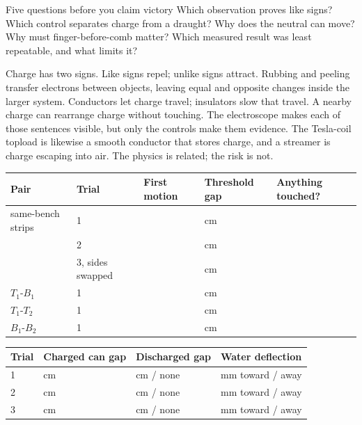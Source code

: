 \begin{telospanel}{Five questions before you claim victory}
Which observation proves like signs? Which control separates charge from a
draught? Why does the neutral can move? Why must finger-before-comb matter?
Which measured result was least repeatable, and what limits it?
\end{telospanel}


Charge has two signs. Like signs repel; unlike signs attract. Rubbing and
peeling transfer electrons between objects, leaving equal and opposite changes
inside the larger system. Conductors let charge travel; insulators slow that
travel. A nearby charge can rearrange charge without touching. The electroscope
makes each of those sentences visible, but only the controls make them evidence.
The Tesla-coil topload is likewise a smooth conductor that stores charge, and a
streamer is charge escaping into air. The physics is related; the risk is not.

\newpage
{}

\begin{center}\small
\begin{tabularx}{\linewidth}{@{}p{.20\linewidth}p{.12\linewidth}p{.18\linewidth}p{.18\linewidth}L@{}}
\toprule
Pair & Trial & First motion & Threshold gap & Anything touched?\\
\midrule
same-bench strips & 1 & & cm & \\[1.35em]
 & 2 & & cm & \\[1.35em]
 & 3, sides swapped & & cm & \\[1.35em]
\midrule
\(T_1\)-\(B_1\) & 1 & & cm & \\[1.35em]
\(T_1\)-\(T_2\) & 1 & & cm & \\[1.35em]
\(B_1\)-\(B_2\) & 1 & & cm & \\[1.35em]
\bottomrule
\end{tabularx}
\end{center}


\begin{center}\small
\begin{tabularx}{.90\linewidth}{@{}p{.16\linewidth}p{.24\linewidth}p{.24\linewidth}L@{}}
\toprule
Trial & Charged can gap & Discharged gap & Water deflection\\
 & cm & cm / none & mm toward / away\\[1.35em]
2 & cm & cm / none & mm toward / away\\[1.35em]
3 & cm & cm / none & mm toward / away\\[1.35em]
\bottomrule
\end{tabularx}
\end{center}

